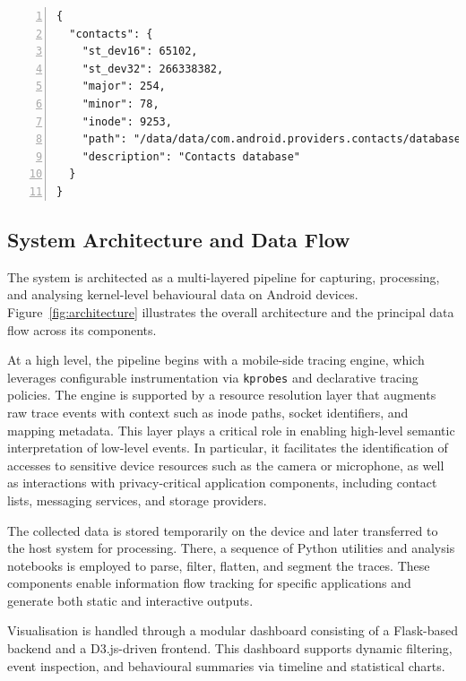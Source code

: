 \documentclass[a4paper,12pt]{report}
\begin{document}
\begin{lstlisting}[caption={Serialized JSON metadata for sensitive resource mapping},label={lst:json-metadata},numbers=left]
{
  "contacts": {
    "st_dev16": 65102,
    "st_dev32": 266338382,
    "major": 254,
    "minor": 78,
    "inode": 9253,
    "path": "/data/data/com.android.providers.contacts/databases/contacts2.db",
    "description": "Contacts database"
  }
}
\end{lstlisting}

\subsection{System Architecture and Data Flow}

The system is architected as a multi-layered pipeline for capturing, processing, and analysing kernel-level behavioural data on Android devices. Figure~\ref{fig:architecture} illustrates the overall architecture and the principal data flow across its components.

At a high level, the pipeline begins with a mobile-side tracing engine, which leverages configurable instrumentation via \texttt{kprobes} and declarative tracing policies. The engine is supported by a resource resolution layer that augments raw trace events with context such as inode paths, socket identifiers, and mapping metadata. This layer plays a critical role in enabling high-level semantic interpretation of low-level events. In particular, it facilitates the identification of accesses to sensitive device resources such as the camera or microphone, as well as interactions with privacy-critical application components, including contact lists, messaging services, and storage providers.

The collected data is stored temporarily on the device and later transferred to the host system for processing. There, a sequence of Python utilities and analysis notebooks is employed to parse, filter, flatten, and segment the traces. These components enable information flow tracking for specific applications and generate both static and interactive outputs.

Visualisation is handled through a modular dashboard consisting of a Flask-based backend and a D3.js-driven frontend. This dashboard supports dynamic filtering, event inspection, and behavioural summaries via timeline and statistical charts.
\end{document}
